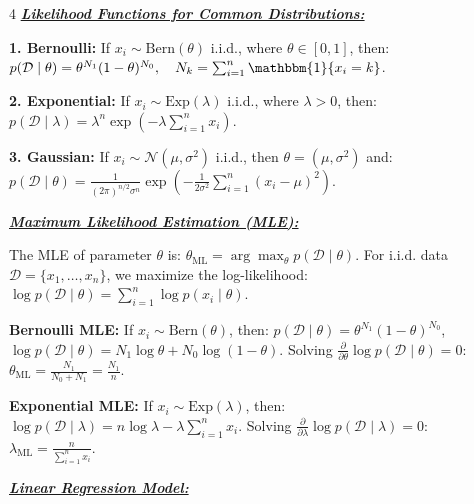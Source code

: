 \documentclass[10pt]{article}
\newcommand{\bulletPoint}[1]{\ul{\textit{\textbf{#1}}}}
\begin{document}
\begin{multicols*}{4}
\bulletPoint{Likelihood Functions for Common Distributions:}\quad

\textbf{1. Bernoulli:} If $x_i \sim \text{Bern}(\theta)$ i.i.d., where $\theta \in [0,1]$, then:
$p(\mathcal{D} \mid \theta) = \theta^{N_1} (1 - \theta)^{N_0}, \quad N_k = \sum_{i=1}^{n} \mathbbm{1}\{x_i = k\}$. 

\textbf{2. Exponential:} If $x_i \sim \text{Exp}(\lambda)$ i.i.d., where $\lambda > 0$, then:
$p(\mathcal{D} \mid \lambda) = \lambda^n \exp \left( -\lambda \sum_{i=1}^{n} x_i \right)$. 

\textbf{3. Gaussian:} If $x_i \sim \mathcal{N}(\mu, \sigma^2)$ i.i.d., then $\theta = (\mu, \sigma^2)$ and:
$p(\mathcal{D} \mid \theta) = \frac{1}{(2\pi)^{n/2} \sigma^n} \exp \left( -\frac{1}{2\sigma^2} \sum_{i=1}^{n} (x_i - \mu)^2 \right)$.


\bulletPoint{Maximum Likelihood Estimation (MLE):}\quad

The MLE of parameter $\theta$ is: $\theta_{\text{ML}} = \arg\max_{\theta} p(\mathcal{D} \mid \theta)$.
For i.i.d. data $\mathcal{D} = \{x_1, \dots, x_n\}$, we maximize the log-likelihood:
$\log p(\mathcal{D} \mid \theta) = \sum_{i=1}^{n} \log p(x_i \mid \theta)$. 

\textbf{Bernoulli MLE:} If $x_i \sim \text{Bern}(\theta)$, then: $p(\mathcal{D} \mid \theta) = \theta^{N_1} (1 - \theta)^{N_0}$,
$\log p(\mathcal{D} \mid \theta) = N_1 \log \theta + N_0 \log (1 - \theta)$. Solving $\frac{\partial}{\partial \theta} \log p(\mathcal{D} \mid \theta) = 0$:
$\theta_{\text{ML}} = \frac{N_1}{N_0 + N_1} = \frac{N_1}{n}$. 

\textbf{Exponential MLE:} If $x_i \sim \text{Exp}(\lambda)$, then: $\log p(\mathcal{D} \mid \lambda) = n \log \lambda - \lambda \sum_{i=1}^{n} x_i$.
Solving $\frac{\partial}{\partial \lambda} \log p(\mathcal{D} \mid \lambda) = 0$: $\lambda_{\text{ML}} = \frac{n}{\sum_{i=1}^{n} x_i}$.


\bulletPoint{Linear Regression Model:}\quad


\end{multicols*}
\end{document}
